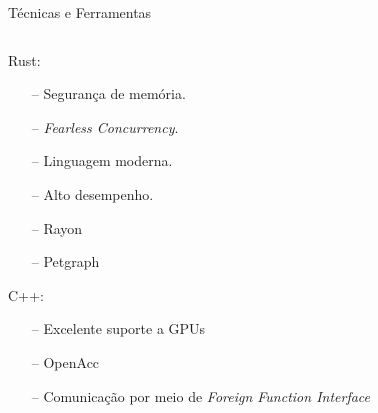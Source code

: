 \begin{frame}{Técnicas e Ferramentas}
    \begin{columns}
    \begin{column}{0.9\textwidth}
    Rust:
    \begin{itemize}
        \item[--] Segurança de memória.
        \item[--] \textit{Fearless Concurrency}.
        \item[--] Linguagem moderna.
        \item[--] Alto desempenho. 
        \item[--] Rayon
        \item[--] Petgraph 
    \end{itemize}
    C++:
    \begin{itemize}
        \item[--] Excelente suporte a GPUs
        \item[--] OpenAcc
        \item[--] Comunicação por meio de \textit{Foreign Function Interface}
    \end{itemize}
    \end{column}


\end{columns}
\end{frame}
